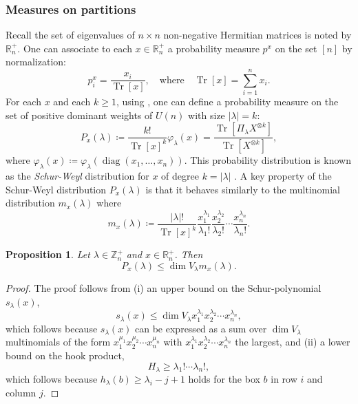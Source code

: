 \documentclass[pdflatex, sn-mathphys-num]{sn-jnl} %
\theoremstyle{plain}
\newtheorem{prop}[thm]{Proposition}
\theoremstyle{definition}
\let\cref\crtcref
\DeclareMathOperator{\diag}{diag}
\DeclareMathOperator{\Tr}{Tr}
\newcommand{\SW}[1]{P_{#1}}
\newcommand{\undomweightsp}[1]{\mathbb Z^{+}_{#1}}
\newcommand{\eigsp}[1]{\mathbb R^{+}_{#1}}
\newcommand{\ot}{\otimes} %
\newcommand{\vp}{\varphi} %
\newcommand{\ex}{x}
\newcommand{\tex}{\Tr[\ex]}
\newcommand{\yx}{\lambda}
\newcommand{\syx}{|\yx|}
\begin{document}
\subsubsection{Measures on partitions}

Recall the set of eigenvalues of $n\times n$ non-negative Hermitian matrices is noted by $\eigsp{n}$.
One can associate to each $\ex \in \eigsp{n}$ a probability measure $p^\ex$ on the set $[n]$ by normalization:
\begin{equation}
    p^\ex_i = \frac{\ex_i}{\tex}, \quad \text{where} \quad \tex = \sum_{i=1}^n \ex_i.
\end{equation}
For each $\ex$ and each $k \geq 1$, using \cref{eq:varphi_normalization}, one can define a probability measure on the set of positive dominant weights of $U(n)$ with size $\syx = k$:
\begin{equation}
    \label{eq:schur_weyl_dist}
    \SW{\ex}(\yx) \coloneqq \frac{k!}{\tex^k} \vp_\yx(x) = \frac{\Tr[\Pi_{\yx} X^{\ot k}]}{\Tr[X^{\ot k}]},
\end{equation}
where $\vp_\yx(x) \coloneqq \vp_{\yx}(\diag(\ex_1, \ldots, \ex_n))$.
This probability distribution is known as the \textit{Schur-Weyl} distribution for $x$ of degree $k = \syx$ \cite{odonnell2016efficient}.
A key property of the Schur-Weyl distribution $\SW{\ex}(\yx)$ is that it behaves similarly to the multinomial distribution $m_{\ex}(\yx)$ where
\begin{equation}
    m_{\ex}(\yx) \coloneqq \frac{\syx!}{\tex^{k}}\frac{\ex_1^{\yx_1}}{\yx_1!}\frac{\ex_2^{\yx_2}}{\yx_2!} \cdots \frac{\ex_n^{\yx_n}}{\yx_n!}.
\end{equation}
\begin{prop}
    \label{prop:multinomial_bound}
    Let $\yx \in \undomweightsp{n}$ and $\ex \in \eigsp{n}$.
    Then
    \begin{equation}
        \SW{\ex}(\yx) \leq \dim V_{\yx} m_{\ex}(\yx).
    \end{equation}
\end{prop}
\begin{proof}
    The proof follows from (i) an upper bound on the Schur-polynomial $s_{\yx}(\ex)$,
    \begin{equation}
        s_{\yx}(\ex) \leq \dim V_{\yx} \ex_1^{\yx_1}\ex_2^{\yx_2}\cdots \ex_n^{\yx_n},
    \end{equation}
    which follows because $s_{\yx}(\ex)$ can be expressed as a sum over $\dim V_{\yx}$ multinomials of the form $\ex_1^{\mu_1}\ex_2^{\mu_2}\cdots \ex_n^{\mu_n}$ with $\ex_1^{\yx_1}\ex_2^{\yx_2}\cdots \ex_n^{\yx_n}$ the largest, and (ii) a lower bound on the hook product,
    \begin{equation}
        H_{\yx} \geq \yx_1!\cdots \yx_n!,
    \end{equation}
    which follows because $h_{\yx}(b) \geq \yx_i - j + 1$ holds for the box $b$ in row $i$ and column $j$.
\end{proof}
\end{document}
